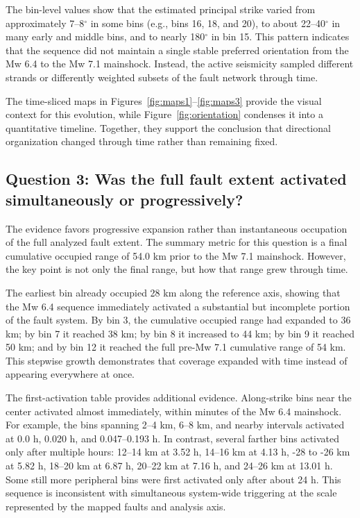 \documentclass[11pt]{article}
\begin{document}
The bin-level values show that the estimated principal strike varied from approximately 7--8$^{\circ}$ in some bins (e.g., bins 16, 18, and 20), to about 22--40$^{\circ}$ in many early and middle bins, and to nearly 180$^{\circ}$ in bin 15. This pattern indicates that the sequence did not maintain a single stable preferred orientation from the Mw 6.4 to the Mw 7.1 mainshock. Instead, the active seismicity sampled different strands or differently weighted subsets of the fault network through time.

The time-sliced maps in Figures~\ref{fig:maps1}--\ref{fig:maps3} provide the visual context for this evolution, while Figure~\ref{fig:orientation} condenses it into a quantitative timeline. Together, they support the conclusion that directional organization changed through time rather than remaining fixed.

\subsection{Question 3: Was the full fault extent activated simultaneously or progressively?}
The evidence favors progressive expansion rather than instantaneous occupation of the full analyzed fault extent. The summary metric for this question is a final cumulative occupied range of 54.0 km prior to the Mw 7.1 mainshock. However, the key point is not only the final range, but how that range grew through time.

The earliest bin already occupied 28 km along the reference axis, showing that the Mw 6.4 sequence immediately activated a substantial but incomplete portion of the fault system. By bin 3, the cumulative occupied range had expanded to 36 km; by bin 7 it reached 38 km; by bin 8 it increased to 44 km; by bin 9 it reached 50 km; and by bin 12 it reached the full pre-Mw 7.1 cumulative range of 54 km. This stepwise growth demonstrates that coverage expanded with time instead of appearing everywhere at once.

The first-activation table provides additional evidence. Along-strike bins near the center activated almost immediately, within minutes of the Mw 6.4 mainshock. For example, the bins spanning 2--4 km, 6--8 km, and nearby intervals activated at 0.0 h, 0.020 h, and 0.047--0.193 h. In contrast, several farther bins activated only after multiple hours: 12--14 km at 3.52 h, 14--16 km at 4.13 h, -28 to -26 km at 5.82 h, 18--20 km at 6.87 h, 20--22 km at 7.16 h, and 24--26 km at 13.01 h. Some still more peripheral bins were first activated only after about 24 h. This sequence is inconsistent with simultaneous system-wide triggering at the scale represented by the mapped faults and analysis axis.
\end{document}
